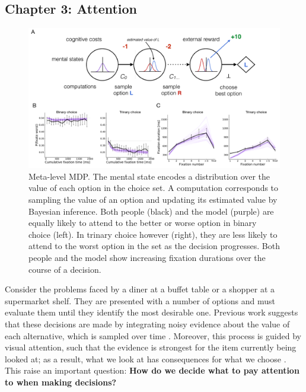 \documentclass[11pt,a4paperpaper,]{article}
\begin{document}

\subsection{Chapter 3: Attention}

\begin{figure}[th]
  \centering
  \includegraphics[width=\textwidth]{diagrams/precis/attention.pdf}
  \caption{
     Meta-level MDP. The mental state encodes a distribution over the value of each option in the choice set. A computation corresponds to sampling the value of an option and updating its estimated value by Bayesian inference.
     Both people (black) and the model (purple) are equally likely to attend to the better or worse option in binary choice (left). In trinary choice however (right), they are less likely to attend to the worst option in the set as the decision progresses.
     Both people and the model show increasing fixation durations over the course of a decision.
  }
  \label{fig:attention}
\end{figure}


Consider the problems faced by a diner at a buffet table or a shopper at a supermarket shelf. They are presented with a number of options and must evaluate them until they identify the most desirable one. Previous work suggests that these decisions are made by integrating noisy evidence about the value of each alternative, which is sampled over time \citep{ratcliff2008diffusion,milosavljevic2010drift,usher2001time}. Moreover, this process is guided by visual attention, such that the evidence is strongest for the item currently being looked at; as a result, what we look at has consequences for what we choose \citep{shimojo2003gaze,armel2008biasing,krajbich2010visual}. This raise an important question: \textbf{How do we decide what to pay attention to when making decisions?}
\end{document}
